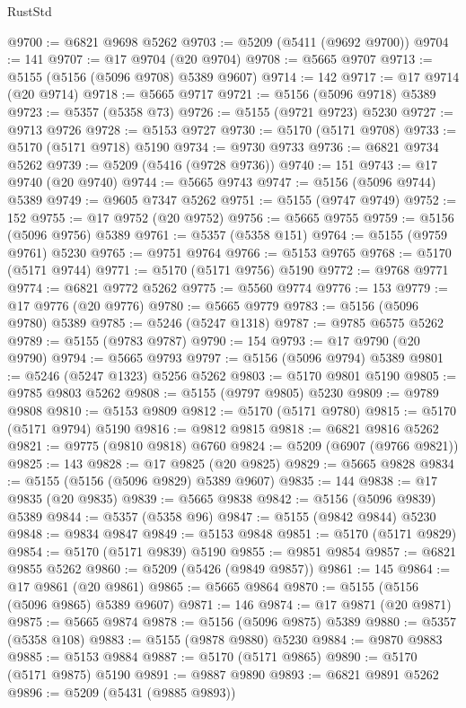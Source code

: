 \begin{lexlean}{RustStd}
\begin{coremodule}
@9700 := @6821 @9698 @5262
@9703 := @5209 (@5411 (@9692 @9700))
@9704 := 141
@9707 := @17 @9704 (@20 @9704)
@9708 := @5665 @9707
@9713 := @5155 (@5156 (@5096 @9708) @5389 @9607)
@9714 := 142
@9717 := @17 @9714 (@20 @9714)
@9718 := @5665 @9717
@9721 := @5156 (@5096 @9718) @5389
@9723 := @5357 (@5358 @73)
@9726 := @5155 (@9721 @9723) @5230
@9727 := @9713 @9726
@9728 := @5153 @9727
@9730 := @5170 (@5171 @9708)
@9733 := @5170 (@5171 @9718) @5190
@9734 := @9730 @9733
@9736 := @6821 @9734 @5262
@9739 := @5209 (@5416 (@9728 @9736))
@9740 := 151
@9743 := @17 @9740 (@20 @9740)
@9744 := @5665 @9743
@9747 := @5156 (@5096 @9744) @5389
@9749 := @9605 @7347 @5262
@9751 := @5155 (@9747 @9749)
@9752 := 152
@9755 := @17 @9752 (@20 @9752)
@9756 := @5665 @9755
@9759 := @5156 (@5096 @9756) @5389
@9761 := @5357 (@5358 @151)
@9764 := @5155 (@9759 @9761) @5230
@9765 := @9751 @9764
@9766 := @5153 @9765
@9768 := @5170 (@5171 @9744)
@9771 := @5170 (@5171 @9756) @5190
@9772 := @9768 @9771
@9774 := @6821 @9772 @5262
@9775 := @5560 @9774
@9776 := 153
@9779 := @17 @9776 (@20 @9776)
@9780 := @5665 @9779
@9783 := @5156 (@5096 @9780) @5389
@9785 := @5246 (@5247 @1318)
@9787 := @9785 @6575 @5262
@9789 := @5155 (@9783 @9787)
@9790 := 154
@9793 := @17 @9790 (@20 @9790)
@9794 := @5665 @9793
@9797 := @5156 (@5096 @9794) @5389
@9801 := @5246 (@5247 @1323) @5256 @5262
@9803 := @5170 @9801 @5190
@9805 := @9785 @9803 @5262
@9808 := @5155 (@9797 @9805) @5230
@9809 := @9789 @9808
@9810 := @5153 @9809
@9812 := @5170 (@5171 @9780)
@9815 := @5170 (@5171 @9794) @5190
@9816 := @9812 @9815
@9818 := @6821 @9816 @5262
@9821 := @9775 (@9810 @9818) @6760
@9824 := @5209 (@6907 (@9766 @9821))
@9825 := 143
@9828 := @17 @9825 (@20 @9825)
@9829 := @5665 @9828
@9834 := @5155 (@5156 (@5096 @9829) @5389 @9607)
@9835 := 144
@9838 := @17 @9835 (@20 @9835)
@9839 := @5665 @9838
@9842 := @5156 (@5096 @9839) @5389
@9844 := @5357 (@5358 @96)
@9847 := @5155 (@9842 @9844) @5230
@9848 := @9834 @9847
@9849 := @5153 @9848
@9851 := @5170 (@5171 @9829)
@9854 := @5170 (@5171 @9839) @5190
@9855 := @9851 @9854
@9857 := @6821 @9855 @5262
@9860 := @5209 (@5426 (@9849 @9857))
@9861 := 145
@9864 := @17 @9861 (@20 @9861)
@9865 := @5665 @9864
@9870 := @5155 (@5156 (@5096 @9865) @5389 @9607)
@9871 := 146
@9874 := @17 @9871 (@20 @9871)
@9875 := @5665 @9874
@9878 := @5156 (@5096 @9875) @5389
@9880 := @5357 (@5358 @108)
@9883 := @5155 (@9878 @9880) @5230
@9884 := @9870 @9883
@9885 := @5153 @9884
@9887 := @5170 (@5171 @9865)
@9890 := @5170 (@5171 @9875) @5190
@9891 := @9887 @9890
@9893 := @6821 @9891 @5262
@9896 := @5209 (@5431 (@9885 @9893))

\end{coremodule}
\end{lexlean}
